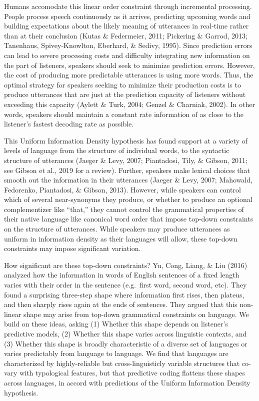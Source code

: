 \documentclass[10pt, letterpaper]{article}
\begin{document}
Humans accomodate this linear order constraint through incremental
processing. People process speech continuously as it arrives, predicting
upcoming words and building expectations about the likely meaning of
utterances in real-time rather than at their conclusion (Kutas \&
Federmeier, 2011; Pickering \& Garrod, 2013; Tanenhaus, Spivey-Knowlton,
Eberhard, \& Sedivy, 1995). Since prediction errors can lead to severe
processing costs and difficulty integrating new information on the part
of listeners, speakers should seek to minimize prediction errors.
However, the cost of producing more predictable utterances is using more
words. Thus, the optimal strategy for speakers seeking to minimize their
production costs is to produce utterances that are just at the
prediction capacity of listeners without exceeding this capacity (Aylett
\& Turk, 2004; Genzel \& Charniak, 2002). In other words, speakers
should maintain a constant rate information of as close to the
listener's fastest decoding rate as possible.

This Uniform Information Density hypothesis has found support at a
variety of levels of language from the structure of individual words, to
the syntactic structure of utterances (Jaeger \& Levy, 2007; Piantadosi,
Tily, \& Gibson, 2011; see Gibson et al., 2019 for a review). Further,
speakers make lexical choices that smooth out the information in their
utterances (Jaeger \& Levy, 2007; Mahowald, Fedorenko, Piantadosi, \&
Gibson, 2013). However, while speakers can control which of several
near-synonyms they produce, or whether to produce an optional
complementizer like ``that,'' they cannot control the grammatical
properties of their native language like canonical word order that
impose top-down constraints on the structure of utterances. While
speakers may produce utterances as uniform in information density as
their languages will allow, these top-down constraints may impose
significant variation.

How significant are these top-down constraints? Yu, Cong, Liang, \& Liu
(2016) analyzed how the information in words of English sentences of a
fixed length varies with their order in the sentence (e.g.~first word,
second word, etc). They found a surprising three-step shape where
information first rises, then plateus, and then sharply rises again at
the ends of sentences. They argued that this non-linear shape may arise
from top-down grammatical constraints on language. We build on these
ideas, asking (1) Whether this shape depends on listener's predictive
models, (2) Whether this shape varies across linguistic contexts, and
(3) Whether this shape is broadly characteristic of a diverse set of
languages or varies predictably from language to language. We find that
languages are characterized by highly-reliable but cross-linguisticly
variable structures that co-vary with typological features, but that
predictive coding flattens these shapes across languages, in accord with
predictions of the Uniform Information Density hypothesis.
\end{document}
